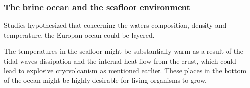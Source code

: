\subsubsection{The brine ocean and the seafloor environment}

Studies hypothesized that concerning the waters composition, density and temperature, the Europan ocean could be layered.

The temperatures in the seafloor might be substantially warm as a result of the tidal waves dissipation and the internal heat flow from the crust, which could lead to explosive cryovolcanism as mentioned earlier. These places in the bottom of the ocean might be highly desirable for living organisms to grow.
